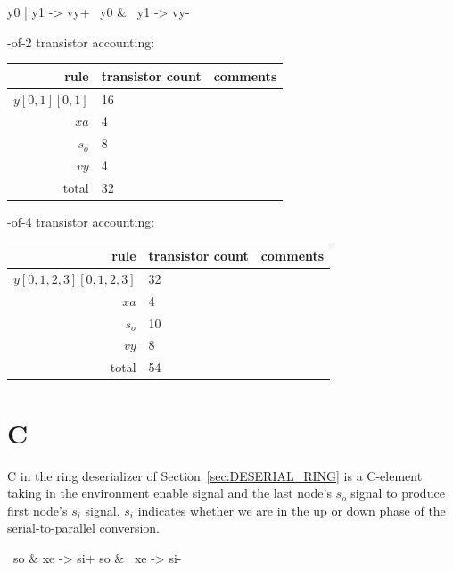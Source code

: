 \documentclass{article}
\begin{document}
\begin{prs2}
y0 | y1 -> vy+
~y0 & ~y1 -> vy-
\end{prs2}

-of-2 transistor accounting:

\begin{center}
    \begin{tabular}{|r|l|l|}
    \hline
    rule & transistor count & comments \\ \hline
    $y[0,1][0,1]$ & 16 \\ \hline
    $xa$ & 4 & \\ \hline
    $s_o$ & 8 & \\ \hline
    $vy$ & 4 & \\ \hline
    \hline total & 32 & \\ \hline
    \end{tabular}
\end{center}

-of-4 transistor accounting:

\begin{center}
    \begin{tabular}{|r|l|l|}
    \hline
    rule & transistor count & comments \\ \hline
    $y[0,1,2,3][0,1,2,3]$ & 32 & \\ \hline
    $xa$ & 4 & \\ \hline
    $s_o$ & 10 & \\ \hline
    $vy$ & 8 & \\ \hline
    \hline total & 54 & \\ \hline
    \end{tabular}
\end{center}

\section{C \label{sec:DESERIAL_RING_C}}

C in the ring deserializer of Section~\ref{sec:DESERIAL_RING} is a C-element 
taking in the environment enable signal and the last node's $s_o$ signal 
to produce first node's $s_i$ signal. $s_i$ indicates whether we are in the
up or down phase of the serial-to-parallel conversion.

\begin{prs2}
~so & xe -> si+
so & ~xe -> si-
\end{prs2}
\end{document}
